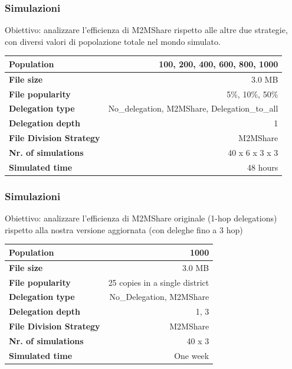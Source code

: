 \documentclass{beamer}
\begin{document}
\begin{frame}
\frametitle{Simulazioni}
Obiettivo: analizzare l'efficienza di M2MShare rispetto alle altre due strategie, con diversi valori di popolazione totale nel mondo simulato.
\small
\begin{table}[h]
\begin{center}
\begin{tabular}{|l|r|}
\hline
\bfseries Population & 100, 200, 400, 600, 800, 1000 \\
\hline
\bfseries File size & 3.0 MB \\
\hline
\bfseries File popularity & 5\%, 10\%, 50\% \\
\hline
\bfseries Delegation type & No\_delegation, M2MShare, Delegation\_to\_all \\
\hline
\bfseries Delegation depth & 1 \\
\hline
\bfseries File Division Strategy & M2MShare \\
\hline
\bfseries Nr. of simulations & 40 x 6 x 3 x 3\\
\hline
\bfseries Simulated time & 48 hours \\
\hline
\end{tabular}
\end{center}
\end{table}
\normalsize
\end{frame}

\begin{frame}
\frametitle{Simulazioni}
Obiettivo: analizzare l'efficienza di M2MShare originale (1-hop delegations) rispetto alla nostra versione aggiornata (con deleghe fino a 3 hop)
\small
\begin{table}[h]
\begin{center}
\begin{tabular}{|l|r|}
\hline
\bfseries Population & 1000 \\
\hline
\bfseries File size & 3.0 MB \\
\hline
\bfseries File popularity & 25 copies in a single district \\
\hline
\bfseries Delegation type & No\_Delegation, M2MShare\\
\hline
\bfseries Delegation depth & 1, 3 \\
\hline
\bfseries File Division Strategy & M2MShare \\
\hline
\bfseries Nr. of simulations & 40 x 3\\
\hline
\bfseries Simulated time & One week \\
\hline
\end{tabular}
\end{center}
\end{table}
\normalsize
\end{frame}
\end{document}
